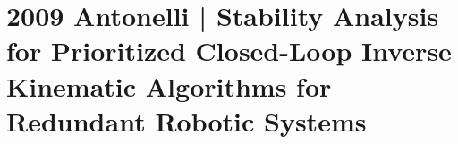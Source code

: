 \section{2009 Antonelli | Stability {{Analysis}} for {{Prioritized Closed-Loop Inverse Kinematic Algorithms}} for {{Redundant Robotic Systems}}}

\cite{antonelli2009} 
